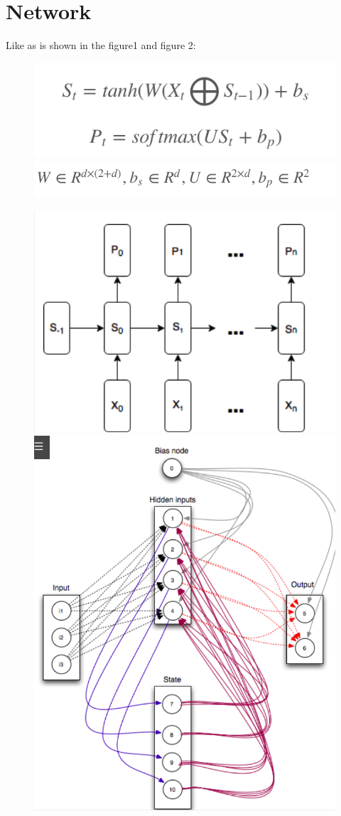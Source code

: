\documentclass[11pt]{article}
\begin{document}
\section{Network}
	Like as is shown in the figure1 and figure 2:\\
\begin{figure}[htbp]	
	\centering
	\includegraphics[width=0.5\linewidth]{pic/111}
	\includegraphics[width=0.5\linewidth]{pic/222}
	\caption{}
\label{fig:111}
\end{figure}
\begin{figure}[htbp]	
	\centering
	\includegraphics[width=0.5\linewidth]{pic/333}
	\includegraphics[width=0.5\linewidth]{pic/444}
	\caption{}
	\label{fig:333}
\end{figure}
\end{document}
